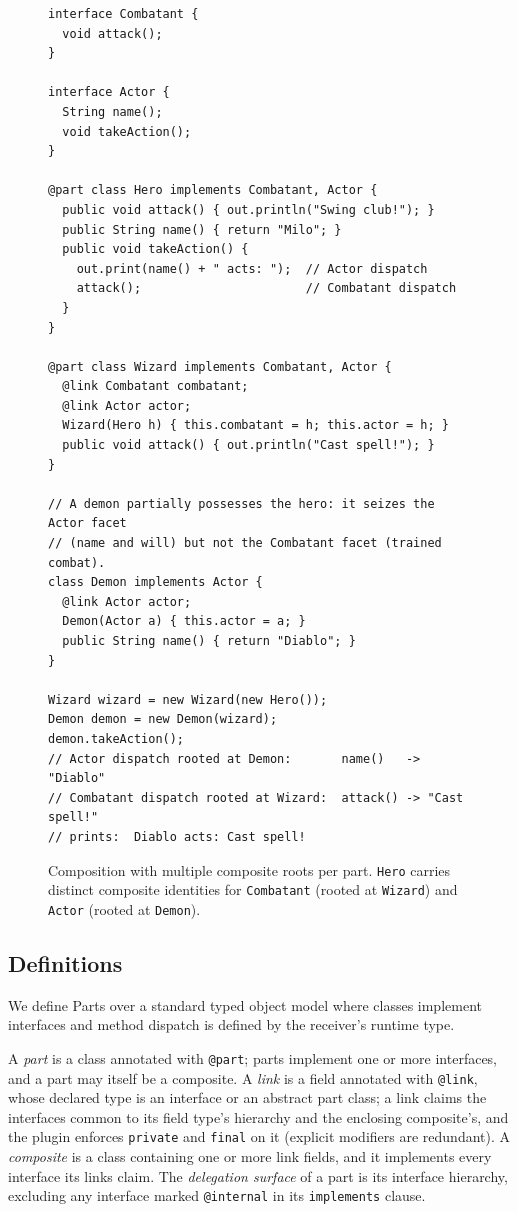 \documentclass[sigplan,10pt,review,anonymous]{acmart}
\theoremstyle{acmplain}
\newcommand{\code}[1]{\texttt{#1}}
\begin{document}
\begin{figure}[H]
\begin{lstlisting}
interface Combatant {
  void attack();
}

interface Actor {
  String name();
  void takeAction();
}

@part class Hero implements Combatant, Actor {
  public void attack() { out.println("Swing club!"); }
  public String name() { return "Milo"; }
  public void takeAction() {
    out.print(name() + " acts: ");  // Actor dispatch
    attack();                       // Combatant dispatch
  }
}

@part class Wizard implements Combatant, Actor {
  @link Combatant combatant;
  @link Actor actor;
  Wizard(Hero h) { this.combatant = h; this.actor = h; }
  public void attack() { out.println("Cast spell!"); }
}

// A demon partially possesses the hero: it seizes the Actor facet
// (name and will) but not the Combatant facet (trained combat).
class Demon implements Actor {
  @link Actor actor;
  Demon(Actor a) { this.actor = a; }
  public String name() { return "Diablo"; }
}

Wizard wizard = new Wizard(new Hero());
Demon demon = new Demon(wizard);
demon.takeAction();
// Actor dispatch rooted at Demon:       name()   -> "Diablo"
// Combatant dispatch rooted at Wizard:  attack() -> "Cast spell!"
// prints:  Diablo acts: Cast spell!
\end{lstlisting}
\caption{Composition with multiple composite roots per part.
\code{Hero} carries distinct composite identities for \code{Combatant}
(rooted at \code{Wizard}) and \code{Actor} (rooted at \code{Demon}).}
\label{fig:dag-listing}
\end{figure}

\subsection*{Definitions}

We define Parts over a standard typed object model where
classes implement interfaces and method dispatch is defined by the receiver's
runtime type.

A \emph{part} is a class annotated with \code{@part}; parts implement one or
more interfaces, and a part may itself be a composite. A \emph{link} is a field
annotated with \code{@link}, whose declared type is an interface or an abstract
part class; a link claims the interfaces common to its field type's hierarchy
and the enclosing composite's, and the plugin enforces \code{private} and
\code{final} on it (explicit modifiers are redundant). A \emph{composite} is a
class containing one or more link fields, and it implements every interface its
links claim. The \emph{delegation surface} of a part is its interface hierarchy,
excluding any interface marked \code{@internal} in its \code{implements} clause.
\end{document}
